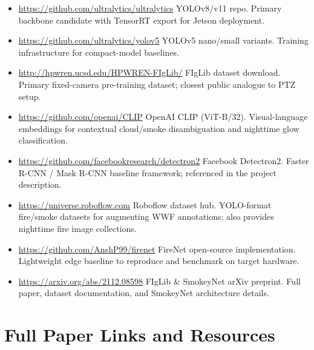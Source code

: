 \documentclass[11pt,twocolumn]{article}
\begin{document}
\begin{itemize}[leftmargin=*, itemsep=2pt]
    \item \url{https://github.com/ultralytics/ultralytics}
          YOLOv8/v11 repo. Primary backbone candidate with TensorRT
          export for Jetson deployment.

    \item \url{https://github.com/ultralytics/yolov5}
          YOLOv5 nano/small variants. Training infrastructure for
          compact-model baselines.

    \item \url{http://hpwren.ucsd.edu/HPWREN-FIgLib/}
          FIgLib dataset download. Primary fixed-camera pre-training
          dataset; closest public analogue to PTZ setup.

    \item \url{https://github.com/openai/CLIP}
          OpenAI CLIP (ViT-B/32). Visual-language embeddings for
          contextual cloud/smoke disambiguation and nighttime glow
          classification.

    \item \url{https://github.com/facebookresearch/detectron2}
          Facebook Detectron2. Faster R-CNN / Mask R-CNN baseline
          framework; referenced in the project description.

    \item \url{https://universe.roboflow.com}
          Roboflow dataset hub. YOLO-format fire/smoke datasets for
          augmenting WWF annotations; also provides nighttime fire
          image collections.

    \item \url{https://github.com/AnshP99/firenet}
          FireNet open-source implementation. Lightweight edge
          baseline to reproduce and benchmark on target hardware.

    \item \url{https://arxiv.org/abs/2112.08598}
          FIgLib \& SmokeyNet arXiv preprint. Full paper, dataset
          documentation, and SmokeyNet architecture details.
\end{itemize}

\section*{Full Paper Links and Resources}
\label{sec:links}
\end{document}
